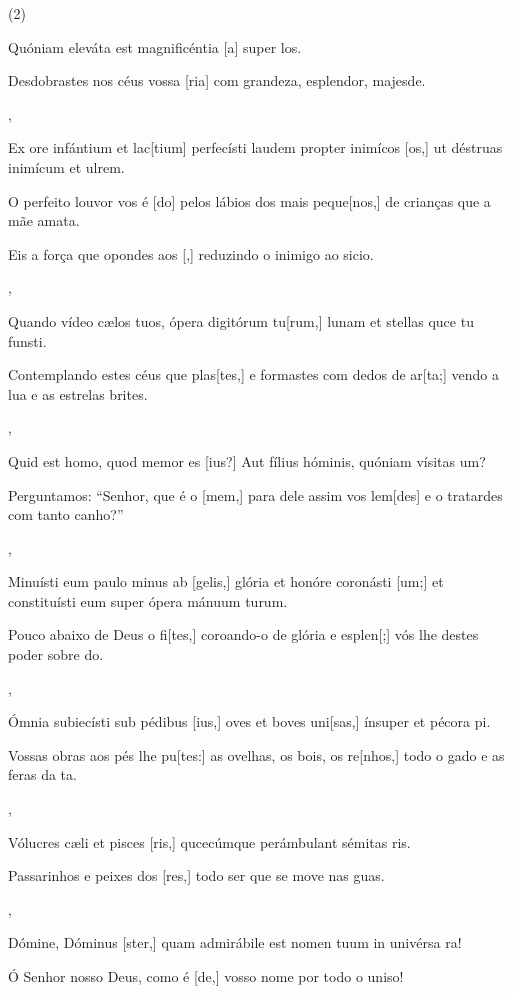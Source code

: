\SetVersePairs(2){
  {\item {}Quóniam eleváta est magnificéntia [a] super \-los.~\Responsorium}%
    {\item {}Desdobrastes nos céus vossa [ria] com grandeza, esplendor, majesde.~\Responsorium},
  {\item {}Ex ore infántium et lac[tium] perfecísti laudem propter inimícos [os,] ut déstruas inimícum et ul\-\-rem.~\Responsorium}%
    {\item {}O perfeito louvor vos é [do] pelos lábios dos mais peque[nos,] de crianças que a mãe ama\-ta.~\Responsorium
    \item {}Eis a força que opondes aos [,] reduzindo o inimigo ao sicio.~\Responsorium},
  {\item {}Quando vídeo cælos tuos, ópera digitórum tu[\-rum,] lunam et stellas quce tu funsti.~\Responsorium}%
    {\item {}Contemplando estes céus que plas[tes,] e formastes com dedos de ar[ta;] vendo a lua e as estrelas brites.~\Responsorium},
  {\item {}Quid est homo, quod memor es [ius?] Aut fílius hóminis, quóniam vísitas um?~\Responsorium}%
    {\item {}Perguntamos: ``Senhor, que é o [mem,] para dele assim vos lem[des] e o tratardes com tanto canho?''~\Responsorium},
  {\item {}Minuísti eum paulo minus ab [gelis,] glória et honóre coronásti [um;] et constituísti eum super ópera mánuum turum.~\Responsorium}%
    {\item {}Pouco abaixo de Deus o fi[tes,] coroando-o de glória e esplen[;] vós lhe destes poder sobre do.~\Responsorium},
  {\item {}Ómnia subiecísti sub pédibus [ius,] oves et boves uni[\-sas,] ínsuper et pécora pi.~\Responsorium}%
    {\item {}Vossas obras aos pés lhe pu[tes:] as ovelhas, os bois, os re[nhos,] todo o gado e as feras da ta.~\Responsorium},
  {\item {}Vólucres cæli et pisces [ris,] qucecúmque perámbulant sémitas ris.~\Responsorium}%
    {\item {}Passarinhos e peixes dos [res,] todo ser que se move nas guas.~\Responsorium},
  {\item {}Dómine, Dóminus [ster,] quam admirábile est nomen tuum in univérsa ra!~\Responsorium}%
    {\item {}Ó Senhor nosso Deus, como é [de,] vosso nome por todo o uniso!~\Responsorium}
}
